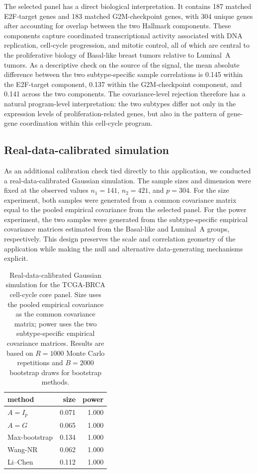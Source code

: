 \documentclass[
  12pt]{article}
\theoremstyle{plain}
\theoremstyle{definition}
\theoremstyle{remark}
\begin{document}
The selected panel has a direct biological interpretation.  It contains 187 matched E2F-target genes and 183 matched G2M-checkpoint genes, with 304 unique genes after accounting for overlap between the two Hallmark components.  These components capture coordinated transcriptional activity associated with DNA replication, cell-cycle progression, and mitotic control, all of which are central to the proliferative biology of Basal-like breast tumors relative to Luminal~A tumors.  As a descriptive check on the source of the signal, the mean absolute difference between the two subtype-specific sample correlations is 0.145 within the E2F-target component, 0.137 within the G2M-checkpoint component, and 0.141 across the two components.  The covariance-level rejection therefore has a natural program-level interpretation: the two subtypes differ not only in the expression levels of proliferation-related genes, but also in the pattern of gene-gene coordination within this cell-cycle program.

\subsection{Real-data-calibrated simulation}

As an additional calibration check tied directly to this application, we conducted a real-data-calibrated Gaussian simulation.  The sample sizes and dimension were fixed at the observed values \(n_1=141\), \(n_2=421\), and \(p=304\).  For the size experiment, both samples were generated from a common covariance matrix equal to the pooled empirical covariance from the selected panel.  For the power experiment, the two samples were generated from the subtype-specific empirical covariance matrices estimated from the Basal-like and Luminal~A groups, respectively.  This design preserves the scale and correlation geometry of the application while making the null and alternative data-generating mechanisms explicit.

\begin{table}[!htbp]
\centering
\caption{Real-data-calibrated Gaussian simulation for the TCGA-BRCA cell-cycle core panel.  Size uses the pooled empirical covariance as the common covariance matrix; power uses the two subtype-specific empirical covariance matrices.  Results are based on \(R=1000\) Monte Carlo repetitions and \(B=2000\) bootstrap draws for bootstrap methods.}
\label{tab:tcga_realdata_calibrated_sim}
\begin{tabular}{lrr}
\toprule
method & size & power \\
\midrule
\(A=I_p\) & 0.071 & 1.000 \\
\(A=G\) & 0.065 & 1.000 \\
Max-bootstrap & 0.134 & 1.000 \\
Wang-NR & 0.062 & 1.000 \\
Li--Chen & 0.112 & 1.000 \\
\bottomrule
\end{tabular}
\end{table}
\end{document}
